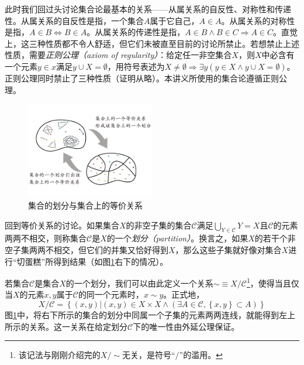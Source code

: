 \documentclass[../main.tex]{subfiles}
\begin{document}
此时我们回过头讨论集合论最基本的关系——从属关系的自反性、对称性和传递性。从属关系的自反性是指，一个集合$A$属于它自己，$A\in A$。从属关系的对称性是指，$A\in B\Leftrightarrow B\in A$。从属关系的传递性是指，$A\in B \wedge B\in C\Rightarrow A\in C$。直觉上，这三种性质都不令人舒适，但它们未被直至目前的讨论所禁止。若想禁止上述性质，需要\emph{正则公理（axiom of regularity）}：给定任一非空集合$X$，则$X$中必含有一个元素$y\in x$满足$y\cup X=\emptyset$，用符号表述为$X\neq \emptyset\Rightarrow\exists y\left(y\in X\wedge y\cup X=\emptyset\right)$。正则公理同时禁止了三种性质（证明从略）。本讲义所使用的集合论遵循正则公理。

\begin{figure}[htbp]
    \centering
    \includegraphics[width=0.5\textwidth]{../images/partition.pdf}
    \caption{集合的划分与集合上的等价关系}
    \label{fig:II.1.2}
\end{figure}

回到等价关系的讨论。如果集合$X$的非空子集的集合$\mathcal{C}$满足$\bigcup_{Y\in\mathcal{C}}Y=X$且$\mathcal{C}$的元素两两不相交，则称集合$\mathcal{C}$是$X$的一个\emph{划分（partition）}。换言之，如果$X$的若干个非空子集两两不相交，但它们的并集又恰好得到$X$，那么这些子集就好像对集合$X$进行“切蛋糕”所得到结果（如图\ref{fig:II.1.2}右下的情况）。

若集合$\mathcal{C}$是集合$X$的一个划分，我们可以由此定义一个关系$\sim\equiv X/\mathcal{C}$\footnote{该记法与刚刚介绍完的$X/\sim$无关，是符号“$/$”的滥用。}，使得当且仅当$X$的元素$x,y$属于$\mathcal{C}$的同一个元素时，$x\sim y$。正式地，
\begin{equation}\label{eq:relation_induced_by_partition}
    X/\mathcal{C}=\left\{\left(x,y\right)|\left(x,y\right)\in X\times X\wedge\left(\exists A\in \mathcal{C},\left\{x,y\right\}\subset A\right)\right\}
\end{equation}
图\ref{fig:II.1.2}中，将右下所示的集合的划分中同属一个子集的元素两两连线，就能得到左上所示的关系。这一关系在给定划分$\mathcal{C}$下的唯一性由外延公理保证。
\end{document}
